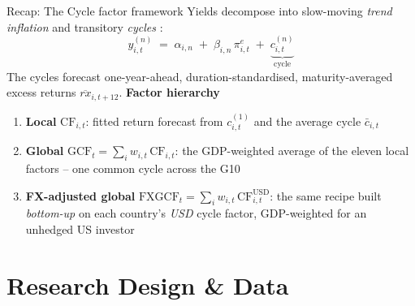 \documentclass[10pt]{beamer}
\newcommand{\CF}{\mathrm{CF}}
\newcommand{\GCF}{\mathrm{GCF}}
\newcommand{\FXGCF}{\mathrm{FXGCF}}
\newcommand{\rxbar}{\overline{rx}}
\begin{document}
\begin{frame}{Recap: The Cycle factor framework}
  Yields decompose into slow-moving \emph{trend inflation} and transitory
  \emph{cycles} \citep{cieslak2015}:
  \begin{equation*}
    y^{(n)}_{i,t} \;=\; \alpha_{i,n} \;+\; \beta_{i,n}\,\pi^{e}_{i,t}
      \;+\; \underbrace{c^{(n)}_{i,t}}_{\text{cycle}}
  \end{equation*}
  The cycles forecast one-year-ahead, duration-standardised,
  maturity-averaged excess returns $\rxbar_{i,t+12}$.
  \vfill
  \textbf{Factor hierarchy}
  \begin{enumerate}
    \item \textbf{Local} $\CF_{i,t}$: fitted return forecast from
      $c^{(1)}_{i,t}$ and the average cycle $\bar c_{i,t}$
    \item \textbf{Global} $\GCF_{t} = \sum_{i} w_{i,t}\,\CF_{i,t}$:
      the GDP-weighted average of the eleven local factors -- one common cycle
      across the G10 \citep{dahlquist2013}
    \item \textbf{FX-adjusted global}
      $\FXGCF_{t} = \sum_{i} w_{i,t}\,\CF^{\mathrm{USD}}_{i,t}$: the same recipe
      built \emph{bottom-up} on each country's \emph{USD} cycle factor,
      GDP-weighted for an unhedged US investor
  \end{enumerate}
\end{frame}

\section{Research Design \& Data}
\end{document}

